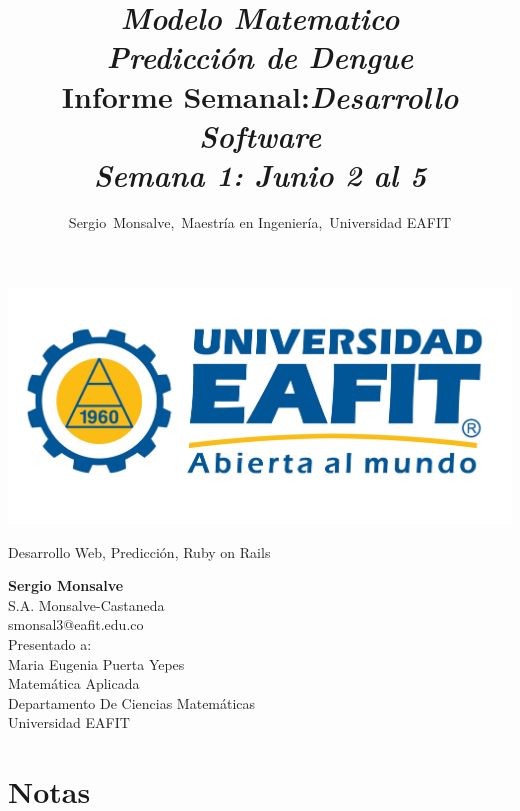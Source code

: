 \documentclass[12pt,journal,compsoc, onecolumn]{IEEEtran}
\author{Sergio~Monsalve,~Maestría en Ingeniería,~Universidad EAFIT}
\title{ \textbf{\textit{Modelo Matematico\\ Predicción de Dengue}}\\
Informe Semanal:\em{Desarrollo Software}\\
Semana 1: Junio 2 al 5\\
}
\begin{document}
\pagestyle{fancyplain}
\fancyhf{}
\headheight=30pt %
\renewcommand{\headrulewidth}{0pt} %

\lhead %
{
\begin{minipage}{2cm}
\includegraphics[width=1.5 in]{Logo_EAFIT.jpg}
\end{minipage}
}

\fancyfoot[c]{\thepage}

\maketitle

\begin{IEEEkeywords}
Desarrollo Web, Predicción, Ruby on Rails
\end{IEEEkeywords}






\begin{center}
\begin{IEEEbiographynophoto}{}
\textbf{Sergio Monsalve}\\
S.A. Monsalve-Castaneda \\
smonsal3@eafit.edu.co\\

Presentado a:\\
Maria Eugenia Puerta Yepes\\[0.2cm]
Matemática Aplicada\\
Departamento De Ciencias Matemáticas\\
Universidad EAFIT
\end{IEEEbiographynophoto}
\end{center}





\appendix
\chapter{Notas}

\end{document}
